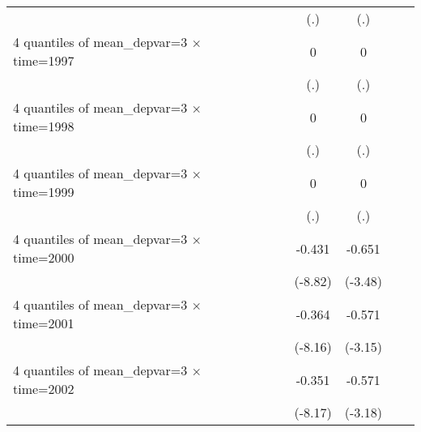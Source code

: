 \begin{table}[htbp]
\begin{tabular}{l*{6}{c}}
                    &                     &                     &         (.)         &         (.)         &                     &                     \\
[1em]
4 quantiles of mean\_depvar=3 $\times$ time=1997&                     &                     &           0         &           0         &                     &                     \\
                    &                     &                     &         (.)         &         (.)         &                     &                     \\
[1em]
4 quantiles of mean\_depvar=3 $\times$ time=1998&                     &                     &           0         &           0         &                     &                     \\
                    &                     &                     &         (.)         &         (.)         &                     &                     \\
[1em]
4 quantiles of mean\_depvar=3 $\times$ time=1999&                     &                     &           0         &           0         &                     &                     \\
                    &                     &                     &         (.)         &         (.)         &                     &                     \\
[1em]
4 quantiles of mean\_depvar=3 $\times$ time=2000&                     &                     &      -0.431\sym{***}&      -0.651\sym{***}&                     &                     \\
                    &                     &                     &     (-8.82)         &     (-3.48)         &                     &                     \\
[1em]
4 quantiles of mean\_depvar=3 $\times$ time=2001&                     &                     &      -0.364\sym{***}&      -0.571\sym{***}&                     &                     \\
                    &                     &                     &     (-8.16)         &     (-3.15)         &                     &                     \\
[1em]
4 quantiles of mean\_depvar=3 $\times$ time=2002&                     &                     &      -0.351\sym{***}&      -0.571\sym{***}&                     &                     \\
                    &                     &                     &     (-8.17)         &     (-3.18)         &                     &                     \\

\end{tabular}
\end{table}
